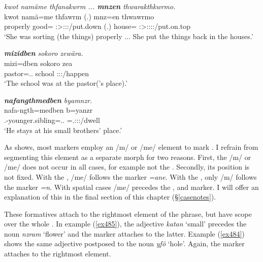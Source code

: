 \begin{exe}
	\ex \emph{kwot namäme thfanakwrm ... \textbf{mnzen} thwarakthkwrmo.}\\
	\gll kwot namä=me thfawrm (.) mnz=en thwawrmo\\
	properly good={\Ins} \Stsg:\Sbj>\Stpl:\Obj:\Pst:\Dur/put.down (.) house={\Loc} \Sg:\Sbj>\Stpl:\Io:\Pst:\Dur:\Andat/put.on.top\\ 
	\trans `She was sorting (the things) properly ... She put the things back in the houses.'
	\label{ex722}
\end{exe}
\begin{exe}
	\ex \emph{\textbf{mizidben} sokoro zewära.}\\
	\gll mizi=dben sokoro zea\\
	pastor=\Loc.\Anim.{\Sg} school \Sg:\Sbj:\Pst:\Pfv/happen\\
	\trans `The school was at the pastor('s place).'
	\label{ex723}
\end{exe}	
\begin{exe}
	\ex \emph{\textbf{nafangthmedben} byamnzr.}\\
	\gll nafa-ngth=medben b=yanzr\\
	\Third.\Poss-younger.sibling=\Loc.\Anim.{\Nsg} \Med=\Tsg.\Masc:\Sbj:\Nonpast:\Ipfv/dwell\\
	\trans `He stays at his small brothers' place.'
	\label{ex724}
\end{exe}
		 	
As  shows, most  markers employ an /m/ or /me/ element to mark  . I refrain from segmenting this element as a separate morph for two reasons. First, the /m/ or /me/ does not occur in all cases, for example not the  . Secondly, its position is not fixed. With the , /me/ follows the  marker \emph{=ane}. With the , only /m/ follows the  marker \emph{=n}. With spatial cases /me/ precedes the ,  and  marker. I will offer an explanation of this in the final section of this chapter ({\S}\ref{casenotes}).

These formatives attach to the rightmost element of the phrase, but have scope over the whole . In example (\ref{ex485}), the adjective \emph{katan} `small' precedes the noun \emph{nzram} `flower' and the  marker attaches to the latter. Example (\ref{ex484}) shows the same adjective postposed to the noun \emph{yfö} `hole'. Again, the  marker attaches to the rightmost element.

